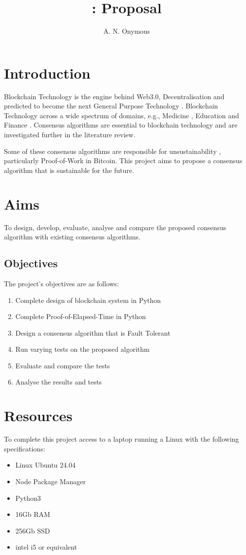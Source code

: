 \documentclass{article}
\title{\moduleCode: Proposal}
\author{A. N. Onymous\\ \studentNumber}
\begin{document}
\maketitle

\section{Introduction}
Blockchain Technology is the engine behind Web3.0, Decentralisation and predicted to become the next General Purpose Technology \cite{filippova2019empirical}.
Blockchain Technology across a wide spectrum of domains, e.g., Medicine \cite{azaria2016medrec}, Education \cite{mitchell2020blockchain} and Finance \cite{treleaven2017blockchain}.
Consensus algorithms are essential to blockchain technology and are investigated further in the literature review. 

Some of these consensus algorithms are responsible for unsustainability \cite{sutherland2019blockchain}, particularly Proof-of-Work in Bitcoin.
This project aims to propose a consensus algorithm that is sustainable for the future.

\section{Aims }
To design, develop, evaluate, analyse and compare the proposed consensus algorithm with existing consensus algorithms.

\subsection{Objectives}
The project's objectives are as follows:
\begin{enumerate}
	\item Complete design of blockchain system in Python
	\item Complete Proof-of-Elapsed-Time in Python 
	\item Design a consensus algorithm that is Fault Tolerant 
	\item Run varying tests on the proposed algorithm
	\item Evaluate and compare the tests
	\item Analyse the results and tests 
\end{enumerate}

\section{Resources}
To complete this project access to a laptop running a Linux with the following specifications:
\begin{itemize}
	\item Linux Ubuntu 24.04
	\item Node Package Manager
	\item Python3
	\item 16Gb RAM
	\item 256Gb SSD
	\item intel i5 or equivalent
\end{itemize}
\end{document}
